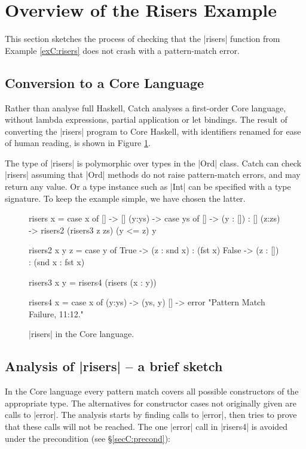 \section{Overview of the Risers Example}
\label{secC:walkthrough}

This section sketches the process of checking that the |risers| function from Example \ref{exC:risers} does not crash with a pattern-match error.


\subsection{Conversion to a Core Language}

Rather than analyse full Haskell, Catch analyses a first-order Core language, without lambda expressions, partial application or let bindings. The result of converting the |risers| program to Core Haskell, with identifiers renamed for ease of human reading, is shown in Figure \ref{figC:risers_core}.

The type of |risers| is polymorphic over types in the |Ord| class. Catch can check |risers| assuming that |Ord| methods do not raise pattern-match errors, and may return any value. Or a type instance such as |Int| can be specified with a type signature. To keep the example simple, we have chosen the latter.

\begin{figure}
\begin{code}
risers x = case x of
    [] -> []
    (y:ys) ->  case ys of
         [] -> (y : []) : []
         (z:zs) -> risers2 (risers3 z zs) (y <= z) y

risers2 x y z =  case y of
    True -> (z : snd x) : (fst x)
    False -> (z : []) : (snd x : fst x)

risers3 x y = risers4 (risers (x : y))

risers4 x = case x of
    (y:ys) -> (ys, y)
    [] -> error "Pattern Match Failure, 11:12."
\end{code}
\caption{|risers| in the Core language.}
\label{figC:risers_core}
\end{figure}

\subsection{Analysis of |risers| -- a brief sketch}

In the Core language every pattern match covers all possible constructors of the appropriate type. The alternatives for constructor cases not originally given are calls to |error|. The analysis starts by finding calls to |error|, then tries to prove that these calls will not be reached. The one |error| call in |risers4| is avoided under the precondition (see \S\ref{secC:precond}):

